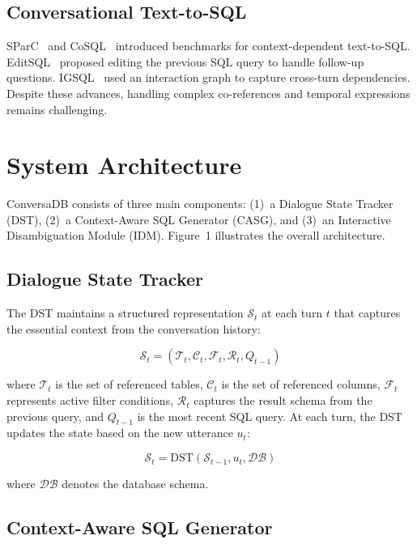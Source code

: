 \documentclass[sigconf,nonacm]{acmart}
\begin{document}
\subsection{Conversational Text-to-SQL}

SParC~\cite{yu2019sparc} and CoSQL~\cite{yu2019cosql} introduced benchmarks for context-dependent text-to-SQL. EditSQL~\cite{zhang2019editing} proposed editing the previous SQL query to handle follow-up questions. IGSQL~\cite{cai2020igsql} used an interaction graph to capture cross-turn dependencies. Despite these advances, handling complex co-references and temporal expressions remains challenging.

\section{System Architecture}

ConversaDB consists of three main components: (1)~a Dialogue State Tracker (DST), (2)~a Context-Aware SQL Generator (CASG), and (3)~an Interactive Disambiguation Module (IDM). Figure~1 illustrates the overall architecture.

\subsection{Dialogue State Tracker}

The DST maintains a structured representation $\mathcal{S}_t$ at each turn $t$ that captures the essential context from the conversation history:

\begin{equation}
\mathcal{S}_t = (\mathcal{T}_t, \mathcal{C}_t, \mathcal{F}_t, \mathcal{R}_t, Q_{t-1})
\end{equation}

\noindent where $\mathcal{T}_t$ is the set of referenced tables, $\mathcal{C}_t$ is the set of referenced columns, $\mathcal{F}_t$ represents active filter conditions, $\mathcal{R}_t$ captures the result schema from the previous query, and $Q_{t-1}$ is the most recent SQL query. At each turn, the DST updates the state based on the new utterance $u_t$:

\begin{equation}
\mathcal{S}_t = \text{DST}(\mathcal{S}_{t-1}, u_t, \mathcal{DB})
\end{equation}

\noindent where $\mathcal{DB}$ denotes the database schema.

\subsection{Context-Aware SQL Generator}
\end{document}
